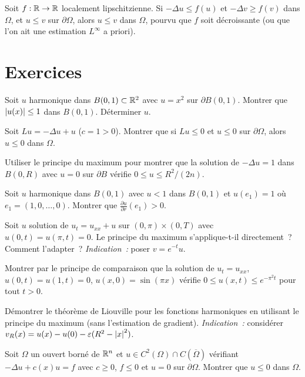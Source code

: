 \begin{theoreme}[Principe de comparaison pour $-\Delta u = f(u)$]
Soit $f : \mathbb{R} \to \mathbb{R}$ localement lipschitzienne. Si
$-\Delta u \leq f(u)$ et $-\Delta v \geq f(v)$ dans $\Omega$,
et $u \leq v$ sur $\partial\Omega$, alors $u \leq v$ dans $\Omega$,
pourvu que $f$ soit d\'ecroissante (ou que l'on ait une estimation
$L^\infty$ a priori).
\end{theoreme}

\section{Exercices}

\begin{exercice}
Soit $u$ harmonique dans $B(0,1) \subset \mathbb{R}^2$ avec $u = x^2$
sur $\partial B(0,1)$. Montrer que $\left| u(x) \right| \leq 1$ dans $B(0,1)$.
D\'eterminer $u$.
\end{exercice}

\begin{exercice}
Soit $Lu = -\Delta u + u$ ($c = 1 > 0$). Montrer que si $Lu \leq 0$ et
$u \leq 0$ sur $\partial\Omega$, alors $u \leq 0$ dans $\Omega$.
\end{exercice}

\begin{exercice}
Utiliser le principe du maximum pour montrer que la solution de
$-\Delta u = 1$ dans $B(0,R)$ avec $u = 0$ sur $\partial B$
v\'erifie $0 \leq u \leq R^2/(2n)$.
\end{exercice}

\begin{exercice}
Soit $u$ harmonique dans $B(0,1)$ avec $u < 1$ dans $B(0,1)$ et
$u(e_1) = 1$ o\`u $e_1 = (1,0,\ldots,0)$. Montrer que
$\frac{\partial u}{\partial r}(e_1) > 0$.
\end{exercice}

\begin{exercice}
Soit $u$ solution de $u_t = u_{xx} + u$ sur $(0,\pi) \times (0,T)$
avec $u(0,t) = u(\pi,t) = 0$. Le principe du maximum s'applique-t-il
directement~? Comment l'adapter~?
\emph{Indication~:} poser $v = e^{-t} u$.
\end{exercice}

\begin{exercice}
Montrer par le principe de comparaison que la solution de
$u_t = u_{xx}$, $u(0,t)=u(1,t)=0$, $u(x,0) = \sin(\pi x)$
v\'erifie $0 \leq u(x,t) \leq e^{-\pi^2 t}$ pour tout $t > 0$.
\end{exercice}

\begin{exercice}
D\'emontrer le th\'eor\`eme de Liouville pour les fonctions harmoniques
en utilisant le principe du maximum (sans l'estimation de gradient).
\emph{Indication~:} consid\'erer $v_R(x) = u(x) - u(0) - \varepsilon(R^2 - \left| x \right|^2)$.
\end{exercice}

\begin{exercice}
Soit $\Omega$ un ouvert born\'e de $\mathbb{R}^n$ et $u \in C^2(\Omega) \cap C(\overline{\Omega})$
v\'erifiant $-\Delta u + c(x) u = f$ avec $c \geq 0$, $f \leq 0$ et $u = 0$
sur $\partial\Omega$. Montrer que $u \leq 0$ dans $\Omega$.
\end{exercice}

